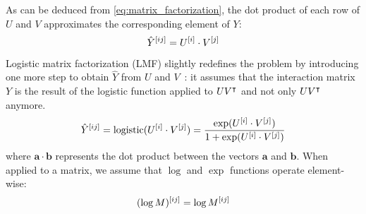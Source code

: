 As can be deduced from \autoref{eq:matrix_factorization}, the dot product of each row of $U$ and $V$ approximates the corresponding element of $Y$:
%
\begin{equation}
    \hat Y^{[ij]} = U^{[i]} \cdot V^{[j]}
\end{equation}
%
Logistic matrix factorization (LMF) slightly redefines the problem by introducing one more step to obtain $\hat Y$ from $U$ and $V$~\cite{johnsonlogistic}: it assumes that the interaction matrix $Y$ is the result of the logistic function applied to $UV^\intercal$ and not only $UV^\intercal$ anymore.
%
\begin{equation}
    \hat Y^{[ij]} = \text{logistic}(U^{[i]} \cdot V^{[j]})
    = \frac{\exp(U^{[i]} \cdot V^{[j]})}{1 + \exp(U^{[i]} \cdot V^{[j]})}
    \label{eq:lmf_prediction}
\end{equation}
%
where $\mathbf{a} \cdot \mathbf{b}$ represents the dot product between the vectors $\mathbf{a}$ and $\mathbf{b}$. When applied to a matrix, we assume that $\log$ and $\exp$ functions operate element-wise:
%
\begin{equation*}
    (\log M)^{[ij]} = \log M^{[ij]}
\end{equation*}

